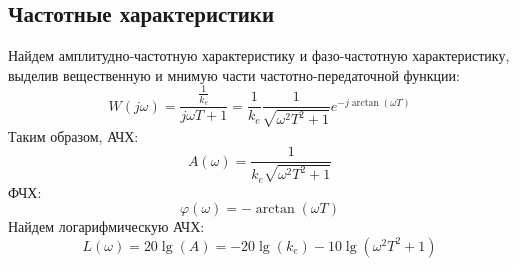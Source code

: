 \FloatBarrier
\subsection{Частотные характеристики}
\noindent Найдем амплитудно-частотную характеристику и фазо-частотную характеристику,
выделив вещественную и мнимую части частотно-передаточной функции:
\begin{equation}
    W(j\omega) = \frac{\frac{1}{k_e}}{j\omega T + 1} = \frac{1}{k_e}\frac{1}{\sqrt{\omega^2T^2 + 1}}e^{-j\arctan(\omega T)}
\end{equation}
Таким образом, АЧХ:
\begin{equation}
    A(\omega) = \frac{1}{k_e\sqrt{\omega^2T^2 + 1}}
\end{equation}
ФЧХ:
\begin{equation}
    \varphi(\omega) = -\arctan(\omega T)
\end{equation}
Найдем логарифмическую АЧХ: 
\begin{equation}
    L(\omega) = 20\lg(A) = -20\lg(k_e) - 10\lg(\omega^2T^2 + 1)
\end{equation}

